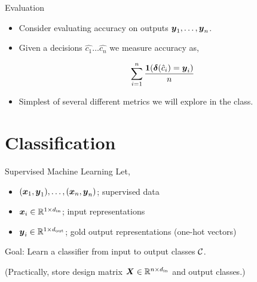\documentclass{beamer}
\begin{document}
\begin{frame}{Evaluation}
  \begin{itemize}
  \item Consider evaluating accuracy on outputs $\boldsymbol{y}_1, \ldots, \boldsymbol{y}_n$. 

  \item Given a decisions $\hat{c_1} \ldots \hat{c_n}$ we measure 
  accuracy as,
  
  \[ \sum_{i=1}^n \frac{\boldsymbol{1}(\boldsymbol{\delta}(\hat{c}_i) = \boldsymbol{y}_i)}{ n} \] 

  \item Simplest of  several different metrics we will explore in the class. 
  \end{itemize}
\end{frame}







\section{Classification}


\begin{frame}{Supervised Machine Learning}
  Let, 
  \begin{itemize}
  \item $(\boldsymbol{x}_1, \boldsymbol{y}_1), \ldots, (\boldsymbol{x}_n, \boldsymbol{y}_n)$; supervised data
  \item $\boldsymbol{x}_i \in \mathbb{R}^{1 \times {d_{\mathrm{in}}}}$;  input representations  
  \item $\boldsymbol{y}_i \in \mathbb{R}^{1 \times {d_{\mathrm{out}}}}$; gold output representations (one-hot vectors)
  \end{itemize}

  Goal: Learn a classifier from input to output classes $\mathcal{C}$.  

  \air
  \air

  (Practically, store design matrix $\boldsymbol{X} \in \mathbb{R}^{n
    \times {d_{\mathrm{in}}}}$ and output classes.)
\end{frame}
\end{document}
